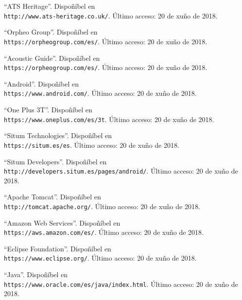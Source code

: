 \documentclass[11pt, a4paper, twoside, titlepage]{book}
\makeatletter
\def\cleardoublepage{\clearpage\if@twoside \ifodd\c@page\else
  \hbox{}
    \thispagestyle{empty}
      \newpage
        \if@twocolumn\hbox{}\newpage\fi\fi\fi}
\makeatother
\begin{document}
\cleardoublepage
{}
\cleardoublepage




\begin{thebibliography}{9}
	``ATS Heritage''. Dispoñíbel en \\\texttt{http://www.ats-heritage.co.uk/}. Último acceso: 20 de xuño de 2018.
	
	``Orpheo Group''. Dispoñíbel en \\\texttt{https://orpheogroup.com/es/}. Último acceso: 20 de xuño de 2018.
	
	``Acoustic Guide''. Dispoñíbel en \\\texttt{https://orpheogroup.com/es/}. Último acceso: 20 de xuño de 2018.
	
	``Android''. Dispoñíbel en \\\texttt{https://www.android.com/}. Último acceso: 20 de xuño de 2018.
	
	``One Plus 3T''. Dispoñíbel en \\\texttt{https://www.oneplus.com/es/3t}. Último acceso: 20 de xuño de 2018.
	
	``Situm Technologies''. Dispoñíbel en \\\texttt{https://situm.es/es}. Último acceso: 20 de xuño de 2018.
	
	``Situm Developers''. Dispoñíbel en \\\texttt{http://developers.situm.es/pages/android/}. Último acceso: 20 de xuño de 2018.
	
	``Apache Tomcat''. Dispoñíbel en \\\texttt{http://tomcat.apache.org/}. Último acceso: 20 de xuño de 2018.
	
	``Amazon Web Services''. Dispoñíbel en \\\texttt{https://aws.amazon.com/es/}. Último acceso: 20 de xuño de 2018.
	
	``Eclipse Foundation''. Dispoñíbel en \\\texttt{https://www.eclipse.org/}. Último acceso: 20 de xuño de 2018.
	
	``Java''. Dispoñíbel en \\\texttt{https://www.oracle.com/es/java/index.html}. Último acceso: 20 de xuño de 2018.
	

\end{thebibliography}
\end{document}
